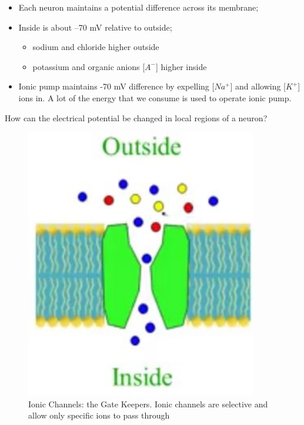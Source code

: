 \documentclass[]{article}
\begin{document}
\begin{itemize}
	\item Each neuron maintains a potential difference across its membrane;
	\item Inside is about –70 mV relative to outside;
	\begin{itemize}
		\item sodium and chloride higher outside
		\item potassium and organic anions [$A^-$] higher inside
	\end{itemize}
	\item Ionic pump maintains -70 mV difference by expelling [$Na^+$] 
	and allowing [$K^+$] ions in. A lot of the energy that we consume is used to operate ionic pump.
\end{itemize}

How can the electrical potential be changed in local regions of a neuron?

\begin{figure}[H]
	\caption[Ionic Channels: the Gate Keepers]{Ionic Channels: the Gate Keepers.  Ionic channels  are selective and 	allow only specific ions to pass through}\label{fig:ionic-channel}
	\includegraphics[width=0.9\textwidth]{ionic-channel}
\end{figure}
\end{document}

